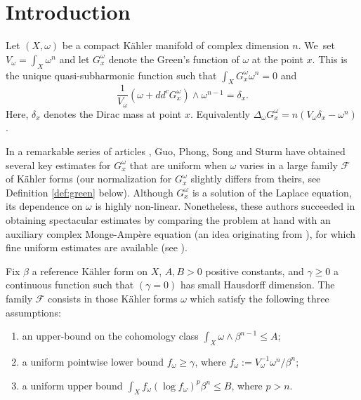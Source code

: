 \documentclass[JEP,XML,SOM,Unicode,published]{cedram}
\theoremstyle{definition}
\begin{document}
\maketitle
\vspace*{-\baselineskip}
\tableofcontents
\mainmatter

\section*{Introduction}

Let $(X,\omega)$ be a compact Kähler manifold of complex dimension $n$. We~set $V_{\omega}=\int_X \omega^n$ and
let $G_x^{\omega}$ denote the Green's function of $\omega$ at the point $x$.
This is the unique quasi-subharmonic function such that $\int_X G_x^{\omega} \omega^n=0$ and
\[
\frac{1}{V_{\omega}} (\omega+dd^c G_x^{\omega}) \wedge \omega^{n-1}=\delta_x.
\]
Here, $\delta_x$ denotes the Dirac mass at point $x$. Equivalently
$\Delta_{\omega} G_x^{\omega}=n( V_{\omega} \delta_x -\omega^n)$.

In a remarkable series of articles \cite{GPS22,GPSS22,GPSS23}, Guo, Phong, Song and Sturm have
obtained several key estimates for $G_x^{\omega}$ that are uniform when $\omega$ varies
in a large family ${\mathcal F}$ of Kähler forms
(our normalization for $G_x^{\omega}$ slightly differs from theirs, see Definition \ref{def:green} below).
Although $G_x^{\omega}$ is a solution of the Laplace equation, its dependence on $\omega$ is highly non-linear.
Nonetheless, these authors succeeded in obtaining spectacular estimates by comparing the problem at hand with an auxiliary
complex Monge-Ampère equation (an idea originating from \cite{CC21}),
for which fine uniform estimates are available
(see \cite{Yau78,Kol98,EGZ09,EGZ08,DP10,BEGZ10,GL21,GPT23}).

Fix $\beta$ a reference Kähler form on $X$,
$A,B>0$ positive constants, and $\gamma \geq 0$ a continuous function such that $(\gamma =0)$ has small Hausdorff dimension.
The family ${\mathcal F}$ consists in those Kähler forms $\omega$
which satisfy the following three assumptions:
\begin{enumerate}
\item an upper-bound on the cohomology class $\int_X \omega \wedge \beta^{n-1} \leq A$;
\item a uniform pointwise lower bound $f_{\omega} \geq \gamma$, where
$f_{\omega}:=V_{\omega}^{-1}\omega^n/\beta^n$;
\item a uniform upper bound $\int_X f_{\omega} (\log f_{\omega})^p \beta^n \leq B$, where $p>n$.
\end{enumerate}
\end{document}
